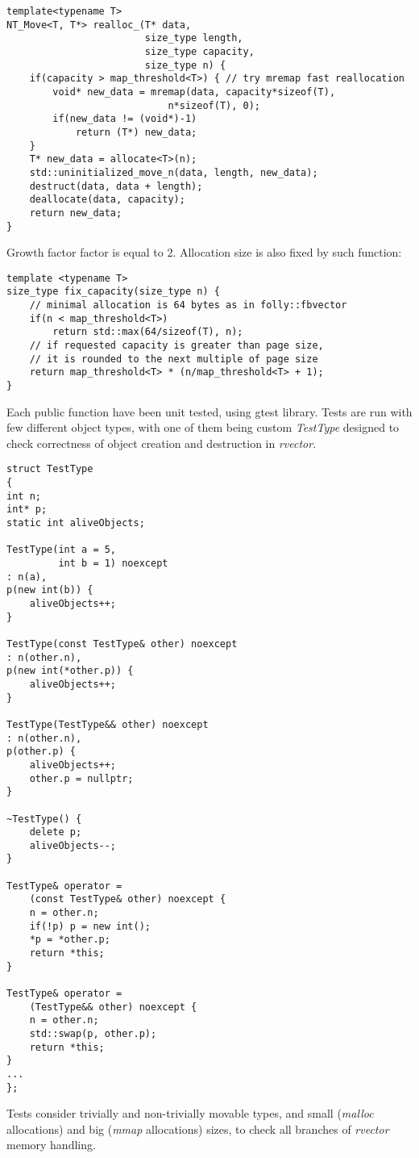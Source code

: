 \documentclass[inz, english, shortabstract]{iithesis}
\begin{document}
\begin{lstlisting}[caption=rvector nontrivial type reallocation]
template<typename T>
NT_Move<T, T*> realloc_(T* data, 
						size_type length, 
						size_type capacity, 
						size_type n) {
    if(capacity > map_threshold<T>) { // try mremap fast reallocation
        void* new_data = mremap(data, capacity*sizeof(T), 
                    		n*sizeof(T), 0);
        if(new_data != (void*)-1)
        	return (T*) new_data;
    }
    T* new_data = allocate<T>(n);
    std::uninitialized_move_n(data, length, new_data);
    destruct(data, data + length);
    deallocate(data, capacity);
    return new_data;
}
\end{lstlisting}
Growth factor factor is equal to 2. Allocation size is also fixed by such function: 

\begin{lstlisting}[caption=fix capacity]
template <typename T>
size_type fix_capacity(size_type n) {
	// minimal allocation is 64 bytes as in folly::fbvector
	if(n < map_threshold<T>)
        return std::max(64/sizeof(T), n);
    // if requested capacity is greater than page size,
    // it is rounded to the next multiple of page size
    return map_threshold<T> * (n/map_threshold<T> + 1);
}
\end{lstlisting}
Each public function have been unit tested, using gtest library\cite{rvector_tests}. Tests are run with few different object types, with one of them being custom {\it TestType} designed to check correctness of object creation and destruction in {\it rvector}.

\begin{lstlisting}[caption=TestType, multicols=2, label=TestType_impl]
struct TestType
{
int n;
int* p;
static int aliveObjects;

TestType(int a = 5, 
		 int b = 1) noexcept
: n(a),
p(new int(b)) {
	aliveObjects++;
}

TestType(const TestType& other) noexcept
: n(other.n),
p(new int(*other.p)) {
	aliveObjects++;
}

TestType(TestType&& other) noexcept
: n(other.n),
p(other.p) {
	aliveObjects++;
	other.p = nullptr;
}

~TestType() {
	delete p;
	aliveObjects--;
}

TestType& operator = 
	(const TestType& other) noexcept {
	n = other.n;
	if(!p) p = new int();
	*p = *other.p;
	return *this;
}

TestType& operator = 
	(TestType&& other) noexcept {
	n = other.n;
	std::swap(p, other.p);
	return *this;
}
...
};
\end{lstlisting}
Tests consider trivially and non-trivially movable types, and small ({\it malloc} allocations) and big ({\it mmap} allocations) sizes, to check all branches of {\it rvector} memory handling.
\end{document}
